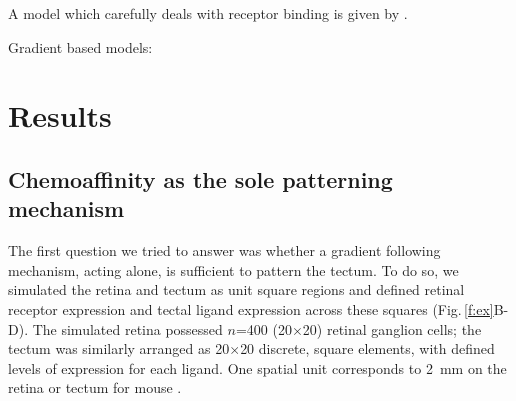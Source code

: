 \documentclass[11pt, a4paper, draft]{article}
\begin{document}
A model which carefully deals with receptor
binding is given by \citet{naoki_revisiting_2017} \citep[see also][]{mortimer_bayesian_2009}.

Gradient based models: \citet{nakamoto_topographically_1996}

\color{black}
\section{Results}

\subsection*{Chemoaffinity as the sole patterning mechanism}

The first question we tried to answer was whether a gradient following
mechanism, acting alone, is sufficient to pattern the tectum. To do so, we
simulated the retina and tectum as unit square regions and defined retinal
receptor expression and tectal ligand expression across these squares
(Fig.\,\ref{f:ex}B-D). The simulated retina possessed $n$=400 (20$\times$20) retinal
ganglion cells; the tectum was similarly arranged as 20$\times$20 discrete, square
elements, with defined levels of expression for each ligand. One spatial unit
corresponds to 2~mm on the retina or tectum for mouse \citep{reber_relative_2004}.
\end{document}
